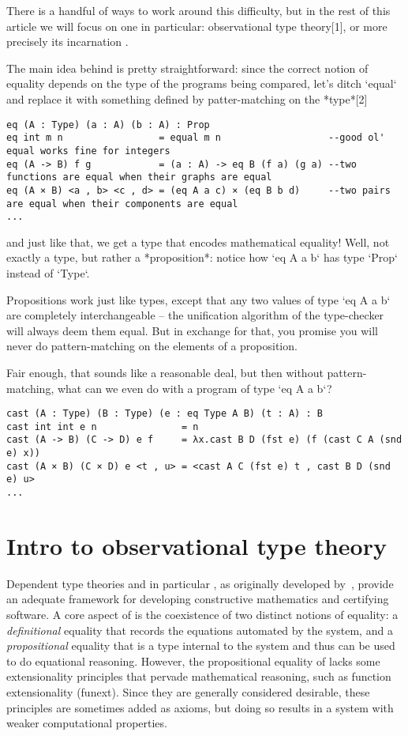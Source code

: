 There is a handful of ways to work around this difficulty, but in the rest of this
article we will focus on one in particular: observational type theory[1], or more
precisely its incarnation \SetoidTT.

The main idea behind \SetoidTT is pretty straightforward: since the correct notion of
equality depends on the type of the programs being compared, let's ditch `equal`
and replace it with something defined by patter-matching on the *type*[2]

\begin{lstlisting}[style=kaolstplain,linewidth=1.5\textwidth]
eq (A : Type) (a : A) (b : A) : Prop
eq int m n                 = equal m n                   --good ol' equal works fine for integers
eq (A -> B) f g            = (a : A) -> eq B (f a) (g a) --two functions are equal when their graphs are equal
eq (A × B) <a , b> <c , d> = (eq A a c) × (eq B b d)     --two pairs are equal when their components are equal
...
\end{lstlisting}

and just like that, we get a type that encodes mathematical equality! Well, not
exactly a type, but rather a *proposition*: notice how `eq A a b` has type `Prop`
instead of `Type`.

Propositions work just like types, except that any two values of type `eq A a b`
are completely interchangeable -- the unification algorithm of the type-checker
will always deem them equal.
But in exchange for that, you promise you will never do pattern-matching on the
elements of a proposition.

Fair enough, that sounds like a reasonable deal, but then without pattern-matching,
what can we even do with a program of type `eq A a b`?

\begin{lstlisting}[style=kaolstplain,linewidth=1.5\textwidth]
cast (A : Type) (B : Type) (e : eq Type A B) (t : A) : B
cast int int e n               = n
cast (A -> B) (C -> D) e f     = λx.cast B D (fst e) (f (cast C A (snd e) x))
cast (A × B) (C × D) e <t , u> = <cast A C (fst e) t , cast B D (snd e) u>
...
\end{lstlisting}

\section{Intro to observational type theory}

Dependent type theories and in particular \MLTT, as originally
developed by~, provide an adequate framework
for developing constructive mathematics and certifying software.
%
A core aspect of \MLTT is the coexistence of two distinct notions of
equality: a \emph{definitional} equality that records the equations
automated by the system, and a \emph{propositional} equality that is
a type internal to the system and thus can be used to do equational
reasoning.
%
However, the propositional equality of \MLTT lacks some extensionality
principles that pervade mathematical reasoning, such as function
extensionality (funext). Since they are generally considered desirable, these
principles are sometimes added as axioms, but doing so results in a system
with weaker computational properties.

